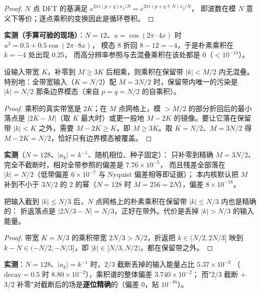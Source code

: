 \begin{proof}
$N$ 点 DFT 的基满足 $e^{2\pi i(p+q)x_j/N}=e^{2\pi i(p+q\mp N)x_j/N}$，
即波数在模 $N$ 意义下等价；逐点乘积的变换因此是循环卷积。
\end{proof}

\textbf{实测（手算可验的现场）}：$N=12$、$u=\cos(2\pi\cdot4x)$ 时 $u^2=0.5+0.5\cos(2\pi\cdot8x)$，
模态 $8$ 折回 $8-12=-4$，于是朴素乘积在 $k=-4$ 处出现 $0.25$，
而高分辨率参照与去混叠乘积在该处都是 $0$（$<10^{-14}$）。

\begin{theorem}[$3N/2$ 补零的保证]
设输入带宽 $K$，补零到 $M\ge3K$ 后相乘，则乘积在保留带 $|k|<M/2$ 内无混叠。
特别地：全带宽输入（$K=N/2$）配 $M=3N/2$ 时，保留带内唯一的污染是
$|k|=N/2$ 那条边界模态（来自 $p=q=N/2$ 的自乘积）。
\end{theorem}

\begin{proof}
乘积的真实带宽是 $2K$；在 $M$ 点网格上，模 $>M/2$ 的部分折回后的最小落点是
$|2K-M|$（取 $K$ 最大时）或更一般地 $M-2K$ 的镜像。要让它落在保留带
$|k|<K$ 之外，需要 $M-2K\ge K$，即 $M\ge3K$。取 $K=N/2$、$M=3N/2$ 得
$M-2K=N/2$，恰好只有边界模态被覆盖。
\end{proof}

\textbf{实测}（$N=128$、$|a_k|=k^{-1}$、随机相位、种子固定）：
只补零到精确 $M=3N/2$、完全不截断时，相对全带参照的偏差是 $7.76\times10^{-5}$，
而且残差全部落在 $|k|=N/2$（低带偏差 $6\times10^{-7}$ 与 Nyquist 偏差相等即证据）；
本内核默认把 $M$ 补到不小于 $3N/2$ 的 $2$ 的幂（$N=128$ 时 $M=256=2N$），偏差 $8\times10^{-18}$。

\begin{theorem}[$2/3$ 规则是另一条路]
把输入截到 $|k|\le N/3$ 后，$N$ 点网格上的朴素乘积在保留带 $|k|\le N/3$ 内也是精确的：
折返落点是 $|2N/3-N|=N/3$，正好在带外。代价是丢掉 $|k|>N/3$ 的输入能量。
\end{theorem}

\begin{proof}
带宽 $K=N/3$ 的乘积带宽 $2N/3>N/2$，折返把 $k\in(N/2,2N/3]$ 映到
$k-N\in(-N/2,-N/3]$，即 $|k|\in[N/3,N/2)$，都在保留带之外。
\end{proof}

\textbf{实测}：$N=128$、$|a_k|=k^{-1}$ 时，$2/3$ 截断丢掉的输入能量占比 $5.37\times10^{-3}$
（$\mathrm{decay}=0.5$ 时 $8.80\times10^{-2}$），乘积谱的整体偏差 $3.740\times10^{-2}$；
而"$2/3$ 截断 $+$ $3/2$ 补零"对截断后的场是\textbf{逐位精确}的（偏差 $0$，贴 $10^{-16}$）。

